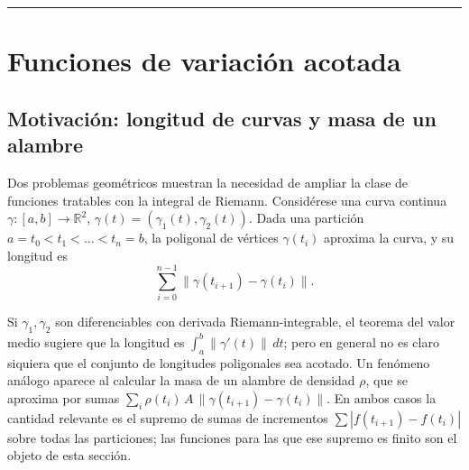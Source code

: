 \documentclass[11pt,twoside]{article}
\newcommand{\R}{\mathbb{R}}
\newcounter{thumbsec}
\newif\ifdrawthumb
\begin{document}
\begin{titlepage}
\vspace{1cm}

{\color{blue!50!black}\rule{0.5\textwidth}{0.6pt}}

\end{titlepage}

\thispagestyle{empty}
{\hypersetup{linkcolor=black}\tableofcontents}
\newpage
\setcounter{thumbsec}{0}
\drawthumbtrue   %

\section{Funciones de variaci\'on acotada}

\subsection{Motivaci\'on: longitud de curvas y masa de un alambre}

Dos problemas geom\'etricos muestran la necesidad de ampliar la clase de funciones tratables con la integral de Riemann. Consid\'erese una curva continua $\gamma : [a,b] \to \R^{2}$, $\gamma(t) = (\gamma_{1}(t), \gamma_{2}(t))$. Dada una partici\'on $a = t_{0} < t_{1} < \dots < t_{n} = b$, la poligonal de v\'ertices $\gamma(t_{i})$ aproxima la curva, y su longitud es
\[
\sum_{i=0}^{n-1} \|\gamma(t_{i+1}) - \gamma(t_{i})\|.
\]

\begin{center}
\end{center}

\noindent Si $\gamma_{1}, \gamma_{2}$ son diferenciables con derivada Riemann-integrable, el teorema del valor medio sugiere que la longitud es $\int_{a}^{b} \|\gamma'(t)\|\,dt$; pero en general no es claro siquiera que el conjunto de longitudes poligonales sea acotado. Un fen\'omeno an\'alogo aparece al calcular la masa de un alambre de densidad $\rho$, que se aproxima por sumas $\sum_{i} \rho(t_{i})\, A\, \|\gamma(t_{i+1}) - \gamma(t_{i})\|$. En ambos casos la cantidad relevante es el supremo de sumas de incrementos $\sum |f(t_{i+1}) - f(t_{i})|$ sobre todas las particiones; las funciones para las que ese supremo es finito son el objeto de esta secci\'on.
\end{document}
